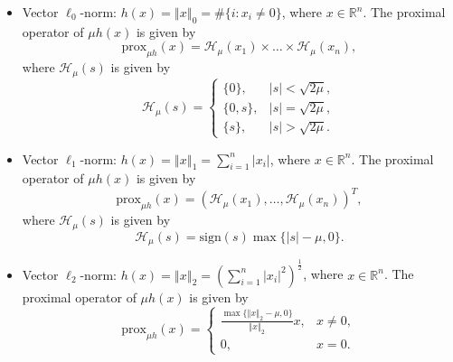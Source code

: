 \documentclass[a4paper]{article}
\newcommand{\norm}[1]{\left\Vert#1\right\Vert}
\newcommand{\mr}{\mathbb{R}}
\newcommand{\mh}{\mathcal{H}}
\newcommand{\prox}{\mathrm{prox}}
\newcommand{\sign}{\mathrm{sign}}
\begin{document}
  \begin{itemize}
    \item {Vector $\ell_0$-norm:} $h(x) = \norm{x}_0 = \# \{i:x_i 
    \ne 0\}$, where $x \in \mr^n$. The proximal operator of $\mu 
    h(x)$ 
    is 
    given by
    \begin{displaymath}
      \prox_{\mu h}(x) = \mh_{\mu}(x_1) \times \ldots \times 
      \mh_{\mu}(x_n),
    \end{displaymath}
    where $\mh_{\mu}(s)$ is given by
    \begin{displaymath}
      \mh_{\mu}(s) = 
      \begin{cases}
        \{0\},    & |s| < \sqrt{2\mu}, \\
        \{0, s\}, & |s| = \sqrt{2\mu}, \\
        \{s\},    & |s| > \sqrt{2\mu}.
      \end{cases}
    \end{displaymath}
    
    \item {Vector $\ell_1$-norm:} $h(x) = \norm{x}_1 = 
    \sum_{i=1}^{n} |x_i|$, where $x \in \mr^n$. The proximal operator 
    of 
    $\mu h(x)$ is given by
    \begin{displaymath}
      \prox_{\mu h}(x) = (\mh_{\mu}(x_1), \ldots, \mh_{\mu}(x_n))^T,
    \end{displaymath}
    where $\mh_{\mu}(s)$ is given by
    \begin{displaymath}
      \mh_{\mu}(s) = \sign(s) \max\{ |s| - \mu, 0 \}.
    \end{displaymath}
    
    \item {Vector $\ell_2$-norm:} $h(x) = \norm{x}_2 = 
    \left( \sum_{i=1}^{n} |x_i|^2 \right)^{\frac{1}{2}}$, where $x 
    \in 
    \mr^n$. The proximal operator of $\mu h(x)$ is given by
    \begin{displaymath}
      \prox_{\mu h}(x) = 
      \begin{cases}
        \frac{\max\{ \norm{x}_2 - \mu, 0 \}}{\norm{x}_2} x, & x \ne 
        0, 
        \\
        0, & x = 0.
      \end{cases}
    \end{displaymath}
    

\end{itemize}
\end{document}
